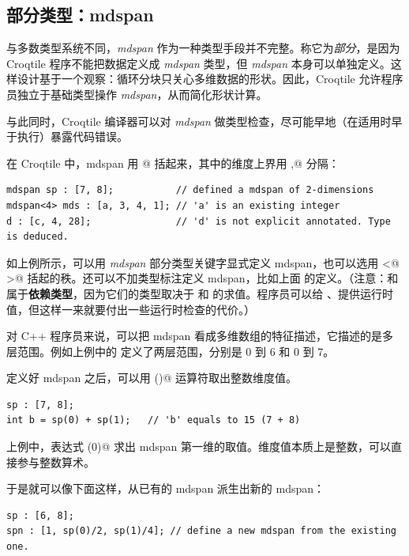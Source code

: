 \subsection*{部分类型：\textbf{mdspan}}

与多数类型系统不同，\emph{mdspan} 作为一种类型手段并不完整。称它为\emph{部分}，是因为 Croqtile 程序不能把数据定义成 \emph{mdspan} 类型，但 \emph{mdspan} 本身可以单独定义。这样设计基于一个观察：循环分块只关心多维数据的形状。因此，Croqtile 允许程序员独立于基础类型操作 \emph{mdspan}，从而简化形状计算。

与此同时，Croqtile 编译器可以对 \emph{mdspan} 做类型检查，尽可能早地（在适用时早于执行）暴露代码错误。

在 Croqtile 中，mdspan 用 \co@[@ 和 \co@]@ 括起来，其中的维度上界用 \co@,@ 分隔：

\begin{lstlisting}[language=croqtile,caption={一个 mdspan 声明}]
mdspan sp : [7, 8];           // defined a mdspan of 2-dimensions
mdspan<4> mds : [a, 3, 4, 1]; // 'a' is an existing integer
d : [c, 4, 28];               // 'd' is not explicit annotated. Type is deduced.
\end{lstlisting}

如上例所示，可以用 \emph{mdspan} 部分类型关键字显式定义 mdspan，也可以选用 \co@<@ \co@>@ 括起的秩。还可以不加类型标注定义 mdspan，比如上面 \co@d@ 的定义。（注意：\co@mds@ 和 \co@d@ 属于\textbf{依赖类型}，因为它们的类型取决于 \co@a@ 和 \co@b@ 的求值。程序员可以给 \co@a@、\co@b@ 提供运行时值，但这样一来就要付出一些运行时检查的代价。）

对 C++ 程序员来说，可以把 mdspan 看成多维数组的特征描述，它描述的是多层范围。例如上例中的 \co@sp@ 定义了两层范围，分别是 0 到 6 和 0 到 7。

定义好 mdspan 之后，可以用 \co@()@ 运算符取出整数维度值。

\begin{lstlisting}[language=croqtile,caption={一个形状字面量}]
sp : [7, 8];
int b = sp(0) + sp(1);   // 'b' equals to 15 (7 + 8)
\end{lstlisting}

上例中，表达式 \co@sp(0)@ 求出 mdspan \co@sp@ 第一维的取值。维度值本质上是整数，可以直接参与整数算术。

于是就可以像下面这样，从已有的 mdspan 派生出新的 mdspan：

\begin{lstlisting}[language=croqtile,caption={改变一个维度后的形状}]
sp : [6, 8];
spn : [1, sp(0)/2, sp(1)/4]; // define a new mdspan from the existing one.
\end{lstlisting}

